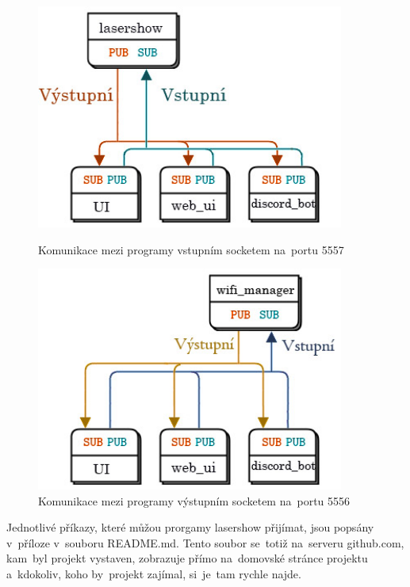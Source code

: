 \begin{figure}[htb]
  \centering
  \begin{minipage}{0.45\textwidth}
    \centering
    \includegraphics[width=0.9\textwidth]{img/comms_lasershow_scheme.jpg}
    \caption{\label{fig:lasershow_comms} Komunikace mezi programy vstupním socketem na~portu 5557}
  \end{minipage}\hfill
  \begin{minipage}{0.45\textwidth}
    \centering
    \includegraphics[width=0.9\textwidth]{img/comms_wifiman_scheme.jpg}
    \caption{\label{fig:wifiman_comms} Komunikace mezi programy výstupním socketem na~portu 5556}
  \end{minipage}
\end{figure}

Jednotlivé příkazy, které můžou prorgamy lasershow přijímat, jsou popsány v~příloze v~souboru README.md. Tento soubor se~totiž na~serveru github.com, kam~byl projekt vystaven, zobrazuje přímo na~domovské stránce projektu a~kdokoliv, koho by~projekt zajímal, si~je~tam rychle najde.
